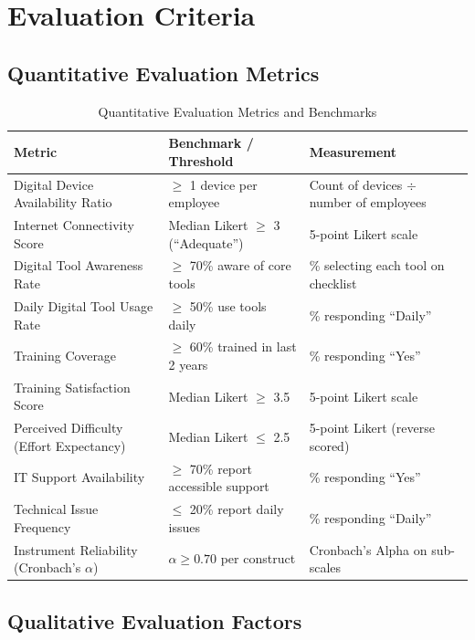 \documentclass[12pt,a4paper]{article}
\begin{document}
\section{Evaluation Criteria}

\subsection{Quantitative Evaluation Metrics}

\begin{table}[H]
\centering
\caption{Quantitative Evaluation Metrics and Benchmarks}
\small
\begin{tabularx}{\textwidth}{L{4cm} L{3.5cm} X}
\toprule
\textbf{Metric} & \textbf{Benchmark / Threshold} & \textbf{Measurement} \\
\midrule
Digital Device Availability Ratio & $\geq$ 1 device per employee & Count of devices $\div$ number of employees \\[4pt]
Internet Connectivity Score & Median Likert $\geq$ 3 (``Adequate'') & 5-point Likert scale \\[4pt]
Digital Tool Awareness Rate & $\geq$ 70\% aware of core tools & \% selecting each tool on checklist \\[4pt]
Daily Digital Tool Usage Rate & $\geq$ 50\% use tools daily & \% responding ``Daily'' \\[4pt]
Training Coverage & $\geq$ 60\% trained in last 2 years & \% responding ``Yes'' \\[4pt]
Training Satisfaction Score & Median Likert $\geq$ 3.5 & 5-point Likert scale \\[4pt]
Perceived Difficulty (Effort Expectancy) & Median Likert $\leq$ 2.5 & 5-point Likert (reverse scored) \\[4pt]
IT Support Availability & $\geq$ 70\% report accessible support & \% responding ``Yes'' \\[4pt]
Technical Issue Frequency & $\leq$ 20\% report daily issues & \% responding ``Daily'' \\[4pt]
Instrument Reliability (Cronbach's $\alpha$) & $\alpha \geq 0.70$ per construct & Cronbach's Alpha on sub-scales \\
\bottomrule
\end{tabularx}
\end{table}

\subsection{Qualitative Evaluation Factors}
\end{document}
